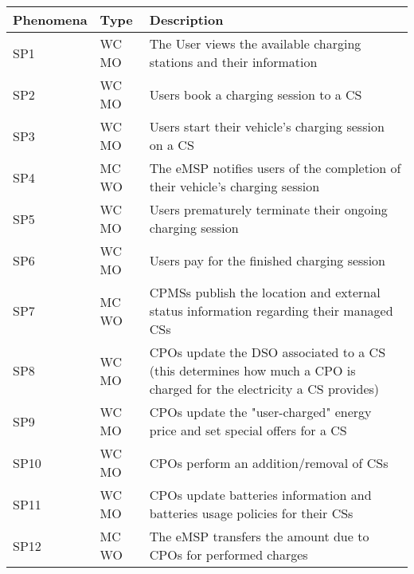\documentclass[11pt]{article}
\begin{document}
\begin{table}[H]
    \centering
    \setlength{\tabcolsep}{18pt}
    \renewcommand{\arraystretch}{1.2}
    \begin{tabularx}{\textwidth}{|>{\centering\hsize=0.3\hsize}X|>{\centering\hsize=0.3\hsize}X|>{\hsize=1.4\hsize}X|}
        \hline
        \textbf{Phenomena} & \textbf{Type} & \textbf{Description} \\
        \hline
        SP1 & WC MO & The User views the available charging stations and their information \\
        \hline
        SP2 & WC MO & Users book a charging session to a CS \\
        \hline
        SP3 & WC MO & Users start their vehicle's charging session on a CS \\
        \hline
        SP4 & MC WO & The eMSP notifies users of the completion of their vehicle's charging session \\
        \hline
        SP5 & WC MO & Users prematurely terminate their ongoing charging session \\
        \hline
        SP6 & WC MO & Users pay for the finished charging session \\
        \hline
        SP7 & MC WO & CPMSs publish the location and external status information regarding their managed CSs \\
        \hline
        SP8 & WC MO & CPOs update the DSO associated to a CS (this determines how much a CPO is charged for the electricity a CS provides) \\
        \hline
        SP9 & WC MO & CPOs update the "user-charged" energy price and set special offers for a CS \\
        \hline
        SP10 & WC MO & CPOs perform an addition/removal of CSs \\
        \hline
        SP11 & WC MO & CPOs update batteries information and batteries usage policies for their CSs \\
        \hline
        SP12 & MC WO & The eMSP transfers the amount due to CPOs for performed charges \\
        \hline
    \end{tabularx}
    \label{tab:shared_phenomena}
\end{table}
\end{document}
